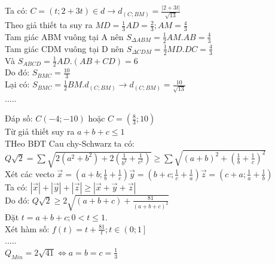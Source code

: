 \hda  
Ta có: $C=\left ( t;2+3t \right )\in d\rightarrow d_{\left ( C;BM \right )}=\frac{\left | 2+3t \right |}{\sqrt{13}}$\\
Theo giả thiết ta suy ra $MD=\frac{1}{3}AD=\frac{2}{3};AM=\frac{4}{3}$\\
Tam giác ABM vuông tại A nên $S_{\Delta ABM}=\frac{1}{2}AM.AB=\frac{4}{3}$\\
Tam giác CDM vuông tại D nên $S_{\Delta CDM}=\frac{1}{2}MD.DC=\frac{4}{3}$\\
Và $S_{ABCD}=\frac{1}{2}AD.(AB+CD)=6$\\
Do đó: $S_{BMC}=\frac{10}{3}$\\
Lại có: $S_{BMC}=\frac{1}{2}BM.d_{\left ( C;BM \right )}\rightarrow d_{\left ( C;BM \right )}=\frac{10}{\sqrt{13}}$\\
.....\\
\vspace{5mm}
 

 

\hspace{12cm} Đáp số: $C\left ( -4;-10 \right )$ hoặc $C=(\frac{8}{3};10)$\\
\hda  
Từ giả thiết suy ra $a+b+c\leq 1$\\
THeo BĐT Cau chy-Schwarz ta có:\\
$Q\sqrt{2}=\sum \sqrt{2\left ( a^{2}+b^{2} \right )+2\left ( \frac{1}{b^{2}}+\frac{1}{c^{2}} \right )}\geq \sum \sqrt{\left ( a+b \right )^{2}+\left ( \frac{1}{b}+\frac{1}{c} \right )^{2}}$\\

Xét các vecto $\vec{x}=\left ( a+b;\frac{1}{b}+\frac{1}{c} \right )
\vec{y}=\left (b+c;\frac{1}{c}+\frac{1}{a}\right)
\vec{z}=\left(c+a;\frac{1}{a}+\frac{1}{b}\right)$\\
Ta có: $\left|\vec{x}\right|+\left | \vec{y} \right |+\left | \vec{z} \right |\geq \left | \vec{x}+\vec{y}+\vec{z} \right |$\\
Do đó: $Q\sqrt{2}\geq 2\sqrt{\left ( a+b+c \right )+\frac{81}{\left ( a+b+c \right )^{2}}}$\\
Đặt $t=a+b+c;0< t\leq 1$.\\
Xét hàm số: $f\left ( t \right )=t+\frac{81}{t};t\in \left(0;1\right]$\\
.....\\
\vspace{5mm}
\hspace{12cm}$Q_{Min}=2\sqrt{41}\Leftrightarrow a=b=c=\frac{1}{3}$\\

